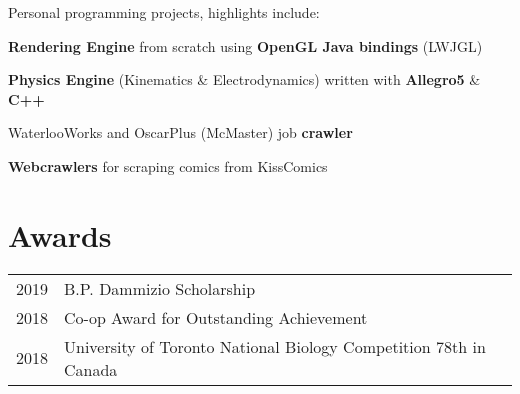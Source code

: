 \documentclass[]{chandan-cv}
\begin{document}
\begin{minipage}[t]{0.71\textwidth}
\descript{ }
\location{ } %
Personal programming projects, highlights include:
\begin{tightemize}
	\item \textbf{Rendering Engine} from scratch using \textbf{OpenGL Java bindings} (LWJGL)
	\item \textbf{Physics Engine} (Kinematics \& Electrodynamics) written with \textbf{Allegro5} \& \textbf{C++}
	\item WaterlooWorks and OscarPlus (McMaster) job \textbf{crawler}
	\item \textbf{Webcrawlers} for scraping comics from KissComics
\end{tightemize}
\sectionsep


\section{Awards}
\begin{tabular}{rll}
2019		&	B.P. Dammizio Scholarship\\
2018		&	Co-op Award for Outstanding Achievement\\
2018		&	University of Toronto National Biology Competition 78th in Canada\\
\end{tabular}
\sectionsep

%
%

\end{minipage}
\end{document}
